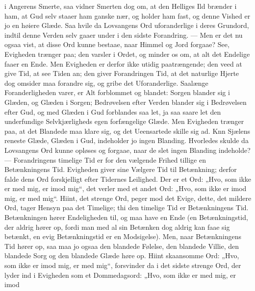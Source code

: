 \documentclass[12pt,a4paper]{book}
\begin{document}
i Angerens Smerte, saa vidner Smerten dog om, at den Helliges Ild brænder i ham,
at Gud selv staaer ham ganske nær, og holder ham fast, og denne Vished er jo en
høiere Glæde. Saa hvile da Lovsangens Ord uforanderlige i deres Grundord, indtil
denne Verden selv gaaer under i den sidste Forandring. --- Men er det nu ogsaa
vist, at disse Ord kunne bestaae, naar Himmel og Jord forgaae? See, Evigheden
trænger paa; den varsler i Ordet, og minder os om, at alt det Endelige faaer en
Ende. Men Evigheden er derfor ikke utidig paatrængende; den veed at give Tid, at
see Tiden an; den giver Forandringen Tid, at det naturlige Hjerte dog omsider maa
forandre sig, og gribe det Uforanderlige. Saalænge Foranderligheden varer, er Alt
forblommet og blandet: Sorgen blander sig i Glæden, og Glæden i Sorgen;
Bedrøvelsen efter Verden blander sig i Bedrøvelsen efter Gud, og med Glæden i Gud
forblandes saa let, ja saa saare let den underfundige Selvkjærligheds egen
forfængelige Glæde. Men Evigheden trænger paa, at det Blandede maa klare sig, og
det Ueensartede skille sig ad. Knn Sjælens reneste Glæde, Glæden i Gud, indeholder
jo ingen Blanding. Hvorledes skulde da Lovsangens Ord kunne opløses og forgaae,
naar de slet ingen Blanding indeholde? --- Forandringens timelige Tid er for den
vælgende Frihed tillige en Betænkningens Tid. Evigheden giver sine Vælgere Tid til
Betænkning; derfor falde dens Ord forskjelligt efter Tidernes Leilighed. Der er et
Ord: „Hvo, som ikke er med mig, er imod mig“, det
verler med et andet Ord: „Hvo, som ikke er imod mig, er med mig“. Hiint, det
strenge Ord, peger mod det Evige, dette, det mildere Ord, tager Hensyn paa det
Timelige; thi den timelige Tid er Betænkningens Tid. Betænkningen hører
Endeligheden til, og maa have en Ende (en Betænkningstid, der aldrig hører op,
fordi man med al sin Betænken dog aldrig kan faae sig betænkt, en evig
Betænkningstid er en Modsigelse). Men, naar
Betænkningens Tid hører op, saa maa jo ogsaa den blandede Følelse, den blandede
Villie, den blandede Sorg og den blandede Glæde høre op. Hiint skaansomme Ord:
„Hvo, som ikke er imod mig, er med mig“, forsvinder da i det sidste strenge Ord,
der lyder ind i Evigheden som et Dommedagsord: „Hvo, som ikke er med mig, er imod
\end{document}
